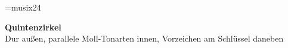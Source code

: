 

\pagestyle{empty}

\font\notenschrift=musix24
\newcommand{\notenzeichen}[1]{{\notenschrift\char#1}}

\newcommand{\kreuzpositionen}{8,5,9,6,3,7,4}
\newcommand{\bepositionen}{4,7,3,6,2,5,1}

\newcommand{\vorzeichenzeile}[6]{%
  \begin{scope}[shift={({#1},{#2})}]
    \foreach \l in {-12,-6,0,6,12}
      \draw[line width=0.35pt] (-36pt,\l pt) -- (36pt,\l pt);
    \node[anchor=base west, inner sep=0] at (-35pt,-6pt) {\notenzeichen{71}};
    \foreach \p [count=\i] in #4 {%
      \ifnum\i>#3\else
        \node[anchor=base west, inner sep=0]
          at ({(-12+(\i-1)*8)*1pt},{(-12+\p*3)*1pt}) {\notenzeichen{#5}};
      \fi}
    \node[text=gray!60!black, font=\footnotesize\sffamily] at (0,-25pt) {#6};
  \end{scope}}


\begin{center}
{\Large\bfseries\sffamily Quintenzirkel}\\[3pt]
{\small Dur außen, parallele Moll-Tonarten innen, Vorzeichen am Schlüssel daneben}
\end{center}
\vspace{-2mm}

